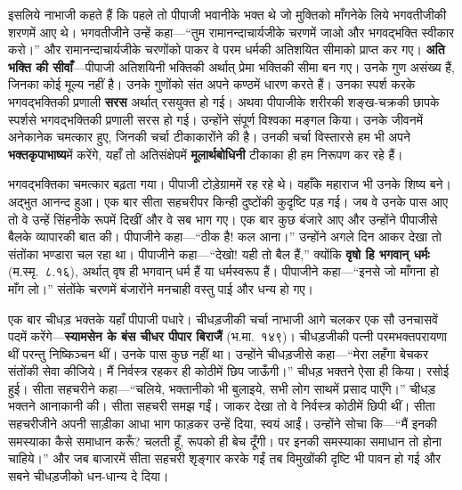 \begin{sloppypar}\justifying{}
इसलिये नाभाजी कहते हैं कि पहले तो पीपाजी भवानीके भक्त थे जो मुक्तिको माँगनेके लिये भगवतीजीकी शरणमें आए थे। भगवतीजीने उन्हें कहा—“तुम रामानन्दाचार्यजीके चरणमें जाओ और भगवद्भक्ति स्वीकार करो।” और रामानन्दाचार्यजीके चरणोंको पाकर वे परम धर्मकी अतिशयित सीमाको प्राप्त कर गए। \textbf{अति भक्ति की सीवाँ}—पीपाजी अतिशयिनी भक्तिकी अर्थात् प्रेमा भक्तिकी सीमा बन गए। उनके गुण असंख्य हैं, जिनका कोई मूल्य नहीं है। उनके गुणोंको संत अपने कण्ठमें धारण करते हैं। उनका स्पर्श करके भगवद्भक्तिकी प्रणाली \textbf{सरस} अर्थात् रसयुक्त हो गई। अथवा पीपाजीके शरीरकी शङ्ख-चक्रकी छापके स्पर्शसे भगवद्भक्तिकी प्रणाली सरस हो गई। उन्होंने संपूर्ण विश्वका मङ्गल किया। उनके जीवनमें अनेकानेक चमत्कार हुए, जिनकी चर्चा टीकाकारोंने की है। उनकी चर्चा विस्तारसे हम भी अपने \textbf{भक्तकृपाभाष्य}में करेंगे, यहाँ तो अतिसंक्षेपमें \textbf{मूलार्थबोधिनी} टीकाका ही हम निरूपण कर रहे हैं।
\end{sloppypar}
\begin{sloppypar}\justifying{}
भगवद्भक्तिका चमत्कार बढ़ता गया। पीपाजी टोड़ेग्राममें रह रहे थे। वहाँके महाराज भी उनके शिष्य बने। अद्भुत आनन्द हुआ। एक बार सीता सहचरीपर किन्ही दुष्टोंकी कुदृष्टि पड़ गई। जब वे उनके पास आए तो वे उन्हें सिंहनीके रूपमें दिखीं और वे सब भाग गए। एक बार कुछ बंजारे आए और उन्होंने पीपाजीसे बैलके व्यापारकी बात की। पीपाजीने कहा—“ठीक है! कल आना।” उन्होंने अगले दिन आकर देखा तो संतोंका भण्डारा चल रहा था। पीपाजीने कहा—“देखो! यही तो बैल हैं,” क्योंकि \textbf{वृषो हि भगवान् धर्मः} (म.स्मृ.~८.१६), अर्थात् वृष ही भगवान् धर्म हैं या धर्मस्वरूप हैं। पीपाजीने कहा—“इनसे जो माँगना हो माँग लो।” संतोंके चरणमें बंजारोंने मनचाही वस्तु पाई और धन्य हो गए।
\end{sloppypar}
\begin{sloppypar}\justifying{}
एक बार चीधड़ भक्तके यहाँ पीपाजी पधारे। चीधड़जीकी चर्चा नाभाजी आगे चलकर एक सौ उनचासवें पदमें करेंगे—\textbf{स्यामसेन के बंस चीधर पीपार बिराजैं} (भ.मा.~१४९)। चीधड़जीकी पत्नी परमभक्तपरायणा थीं परन्तु निष्किञ्चन थीं। उनके पास कुछ नहीं था। उन्होंने चीधड़जीसे कहा—“मेरा लहँगा बेचकर संतोंकी सेवा कीजिये। मैं निर्वस्त्र रहकर ही कोठीमें छिप जाऊँगी।” चीधड़ भक्तने ऐसा ही किया। रसोई हुई। सीता सहचरीने कहा—“चलिये, भक्तानीको भी बुलाइये, सभी लोग साथमें प्रसाद पाएँगे।” चीधड़ भक्तने आनाकानी की। सीता सहचरी समझ गईं। जाकर देखा तो वे निर्वस्त्र कोठीमें छिपी थीं। सीता सहचरीजीने अपनी साड़ीका आधा भाग फाड़कर उन्हें दिया, स्वयं आईं। उन्होंने सोचा कि—“मैं इनकी समस्याका कैसे समाधान करूँ? चलती हूँ, रूपको ही बेच दूँगी। पर इनकी समस्याका समाधान तो होना चाहिये।” और जब बाजारमें सीता सहचरी शृङ्गार करके गईं तब विमुखोंकी दृष्टि भी पावन हो गई और सबने चीधड़जीको धन-धान्य दे दिया।
\end{sloppypar}
